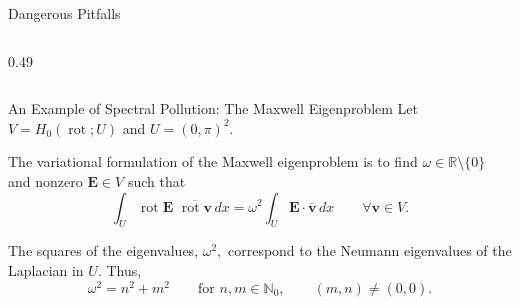 \documentclass[aspectratio=169]{beamer}
\begin{document}
\begin{frame}{Dangerous Pitfalls}
\begin{columns}[T,onlytextwidth]
\begin{column}{0.49\textwidth}
{%
}
\end{column}
\end{columns}

\end{frame}

\begin{frame}{An Example of Spectral Pollution: The Maxwell Eigenproblem}
Let $V = H_0(\operatorname{rot};U)$ and $U = (0, \pi)^2.$

\vspace{1em}

The variational formulation of the Maxwell eigenproblem is to find $\omega\in\mathbb R\setminus\{0\}$ and nonzero $\mathbf E \in V$ such that
$$\int_{U} \operatorname{rot}\mathbf E \,\, \overline{\operatorname{rot}\mathbf v} \, dx = \omega^2 \int_{U} \mathbf E \cdot \overline{\mathbf v} \, dx \qquad
\forall \mathbf v\in V.
$$

\vspace{1em}

The squares of the eigenvalues, $\omega^2,$ correspond to the Neumann eigenvalues of the Laplacian in $U.$ Thus,
$$ \omega^2 = n^2 + m^2 \qquad \text{for } n, m \in \mathbb{N}_0, \qquad (m,n) \ne (0, 0).$$ 
\end{frame}
\end{document}
